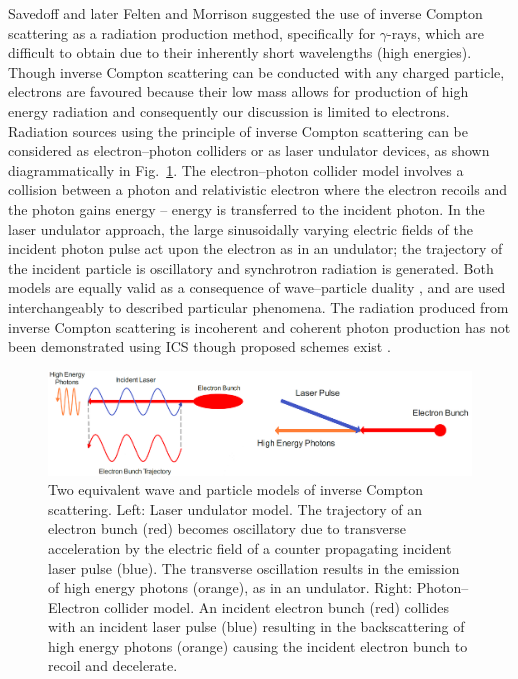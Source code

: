 \documentclass[../main.tex]{subfiles}
\begin{document}
Savedoff \cite{savedoff1959crab} and later Felten and Morrison \cite{felten1963recoil} suggested the use of inverse Compton scattering as a radiation production method, specifically for $\gamma$-rays, which are difficult to obtain due to their inherently short wavelengths (high energies). Though inverse Compton scattering can be conducted with any charged particle, electrons are favoured because their low mass allows for production of high energy radiation and consequently our discussion is limited to electrons. Radiation sources using the principle of inverse Compton scattering can be considered as electron--photon colliders or as laser undulator devices, as shown diagrammatically in Fig.~\ref{fig:ICS_laser_undulator_collision}. The electron--photon collider model involves a collision between a photon and relativistic electron where the electron recoils and the photon gains energy -- energy is transferred to the incident photon. In the laser undulator approach, the large sinusoidally varying electric fields of the incident photon pulse act upon the electron as in an undulator; the trajectory of the incident particle is oscillatory and synchrotron radiation is generated. Both models are equally valid as a consequence of wave--particle duality \cite{de1923waves}, and are used interchangeably to described particular phenomena. The radiation produced from inverse Compton scattering is incoherent and coherent photon production has not been demonstrated using ICS though proposed schemes exist \cite{graves2012intense,graves2014compact,nanni2018nanomodulated}.
\begin{figure}[!h]
\centering
\includegraphics[width=\textwidth]{Figures/Introduction/ICS_laser_undulator_collision.pdf}
\caption{Two equivalent wave and particle models of inverse Compton scattering. Left: Laser undulator model. The trajectory of an electron bunch (red) becomes oscillatory due to transverse acceleration by the electric field of a counter propagating incident laser pulse (blue). The transverse oscillation results in the emission of high energy photons (orange), as in an undulator. Right: Photon--Electron collider model. An incident electron bunch (red) collides with an incident laser pulse (blue) resulting in the backscattering of high energy photons (orange) causing the incident electron bunch to recoil and decelerate.}
\label{fig:ICS_laser_undulator_collision}
\end{figure}
\end{document}
